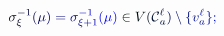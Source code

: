 \documentclass[12pt]{article}
\begin{document}
\makeatletter
\renewcommand*{\@textcolor}[3]{%
  \protect\leavevmode
  \begingroup
    \color#1{#2}#3%
  \endgroup
}
\makeatother
\begin{displaymath}
\mathcolor[RGB]{0,0,15}{\sigma} _ { \mathcolor[RGB]{0,0,30}{\xi} } ^ { \mathcolor[RGB]{0,0,45}{-} \mathcolor[RGB]{0,0,60}{1} } \mathcolor[RGB]{0,0,75}{(} \mathcolor[RGB]{0,0,90}{\mu} \mathcolor[RGB]{0,0,105}{)} \mathcolor[RGB]{0,0,120}{=} \mathcolor[RGB]{0,0,135}{\sigma} _ { \mathcolor[RGB]{0,0,150}{\xi} \mathcolor[RGB]{0,0,165}{+} \mathcolor[RGB]{0,0,180}{1} } ^ { \mathcolor[RGB]{0,0,195}{-} \mathcolor[RGB]{0,0,210}{1} } \mathcolor[RGB]{0,0,225}{(} \mathcolor[RGB]{0,0,240}{\mu} \mathcolor[RGB]{0,0,255}{)} \mathcolor[RGB]{0,15,0}{\in} \mathcolor[RGB]{0,15,15}{V} \mathcolor[RGB]{0,15,30}{(} \mathcal { \mathcolor[RGB]{0,15,45}{C} } _ { \mathcolor[RGB]{0,15,60}{a} } ^ { \mathcolor[RGB]{0,15,75}{\ell} } \mathcolor[RGB]{0,15,90}{)} \mathcolor[RGB]{0,15,105}{\setminus} \mathcolor[RGB]{0,15,120}{\{} \mathcolor[RGB]{0,15,135}{v} _ { \mathcolor[RGB]{0,15,150}{a} } ^ { \mathcolor[RGB]{0,15,165}{\ell} } \mathcolor[RGB]{0,15,180}{\}} \mathcolor[RGB]{0,15,195}{;}
\end{displaymath}
\end{document}
